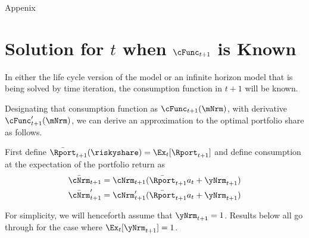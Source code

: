 \documentclass{handout}
\begin{document}
\pagebreak
\centerline{\Large Appenix}
\appendix
\section{Solution for $t$ when $\cFunc_{t+1}$ is Known}

In either the life cycle version of the model or an infinite horizon model that is being solved by time iteration, the consumption function in $t+1$ will be known.

Designating that consumption function as $\cFunc_{t+1}(\mNrm)$, with derivative $\cFunc^{\prime}_{t+1}(\mNrm)$, we can derive an approximation to the optimal portfolio share as follows.

\newcommand{\ERport}{\bar{\Rport}}
\newcommand{\cNxt}{\bar{\cFunc}_{t+1}}
\newcommand{\orderTwo}{+(1/2)(\riskyshare\EpremLog_{t+1}{a}_{t})^{2}\cFunc^{\prime\prime}_{t+1}}
\renewcommand{\orderTwo}{}

First define $\ERport_{t+1}(\riskyshare)=\Ex_{t}[\Rport_{t+1}]$ and define consumption at the expectation of the portfolio return as
\begin{align}
\bar{\cNrm}_{t+1} &= \cNrm_{t+1}(\ERport_{t+1}{a}_{t} + \yNrm_{t+1})
\\ \bar{\cNrm}^{\prime}_{t+1}& = \cNrm_{t+1}^{\prime}(\ERport_{t+1}{a}_{t} + \yNrm_{t+1})
\end{align}

For simplicity, we will henceforth assume that $\yNrm_{t+1}=1$.  Results below all go through for the case where $\Ex_{t}[\yNrm_{t+1}]=1$.
\end{document}
